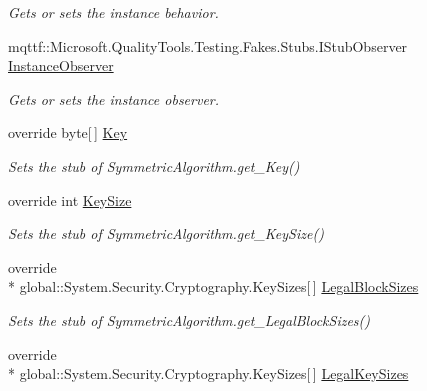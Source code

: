 \begin{DoxyCompactItemize}
\begin{DoxyCompactList}\small\item\em Gets or sets the instance behavior.\end{DoxyCompactList}\item 
mqttf\-::\-Microsoft.\-Quality\-Tools.\-Testing.\-Fakes.\-Stubs.\-I\-Stub\-Observer \hyperlink{class_system_1_1_security_1_1_cryptography_1_1_fakes_1_1_stub_rijndael_a14aa955918a85e764ef1ee21f11f99b6}{Instance\-Observer}
\begin{DoxyCompactList}\small\item\em Gets or sets the instance observer.\end{DoxyCompactList}\item 
override byte\mbox{[}$\,$\mbox{]} \hyperlink{class_system_1_1_security_1_1_cryptography_1_1_fakes_1_1_stub_rijndael_a8365f14cbc433f6142b0cdac2d470f40}{Key}
\begin{DoxyCompactList}\small\item\em Sets the stub of Symmetric\-Algorithm.\-get\-\_\-\-Key()\end{DoxyCompactList}\item 
override int \hyperlink{class_system_1_1_security_1_1_cryptography_1_1_fakes_1_1_stub_rijndael_adde7919794b7a68f56e8d64f4119559e}{Key\-Size}
\begin{DoxyCompactList}\small\item\em Sets the stub of Symmetric\-Algorithm.\-get\-\_\-\-Key\-Size()\end{DoxyCompactList}\item 
override \\*
global\-::\-System.\-Security.\-Cryptography.\-Key\-Sizes\mbox{[}$\,$\mbox{]} \hyperlink{class_system_1_1_security_1_1_cryptography_1_1_fakes_1_1_stub_rijndael_a35b1caf60f73cf712bb797a5054461c0}{Legal\-Block\-Sizes}
\begin{DoxyCompactList}\small\item\em Sets the stub of Symmetric\-Algorithm.\-get\-\_\-\-Legal\-Block\-Sizes()\end{DoxyCompactList}\item 
override \\*
global\-::\-System.\-Security.\-Cryptography.\-Key\-Sizes\mbox{[}$\,$\mbox{]} \hyperlink{class_system_1_1_security_1_1_cryptography_1_1_fakes_1_1_stub_rijndael_acf29f61b36fc695f00d89adad5e4ca78}{Legal\-Key\-Sizes}

\end{DoxyCompactItemize}

